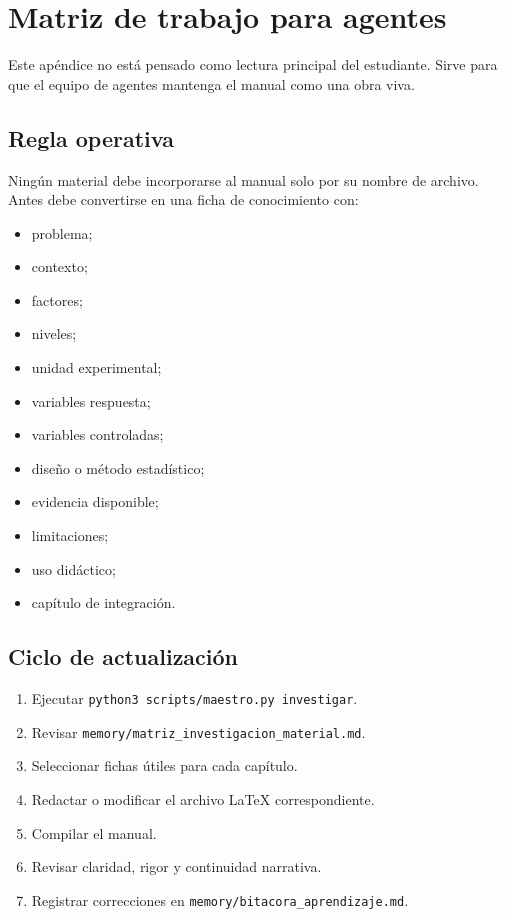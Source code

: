 \chapter{Matriz de trabajo para agentes}

Este apéndice no está pensado como lectura principal del estudiante. Sirve para que el equipo de agentes mantenga el manual como una obra viva.

\section{Regla operativa}

Ningún material debe incorporarse al manual solo por su nombre de archivo. Antes debe convertirse en una ficha de conocimiento con:

\begin{itemize}
  \item problema;
  \item contexto;
  \item factores;
  \item niveles;
  \item unidad experimental;
  \item variables respuesta;
  \item variables controladas;
  \item diseño o método estadístico;
  \item evidencia disponible;
  \item limitaciones;
  \item uso didáctico;
  \item capítulo de integración.
\end{itemize}

\section{Ciclo de actualización}

\begin{enumerate}
  \item Ejecutar \texttt{python3 scripts/maestro.py investigar}.
  \item Revisar \texttt{memory/matriz\_investigacion\_material.md}.
  \item Seleccionar fichas útiles para cada capítulo.
  \item Redactar o modificar el archivo \LaTeX{} correspondiente.
  \item Compilar el manual.
  \item Revisar claridad, rigor y continuidad narrativa.
  \item Registrar correcciones en \texttt{memory/bitacora\_aprendizaje.md}.
\end{enumerate}

